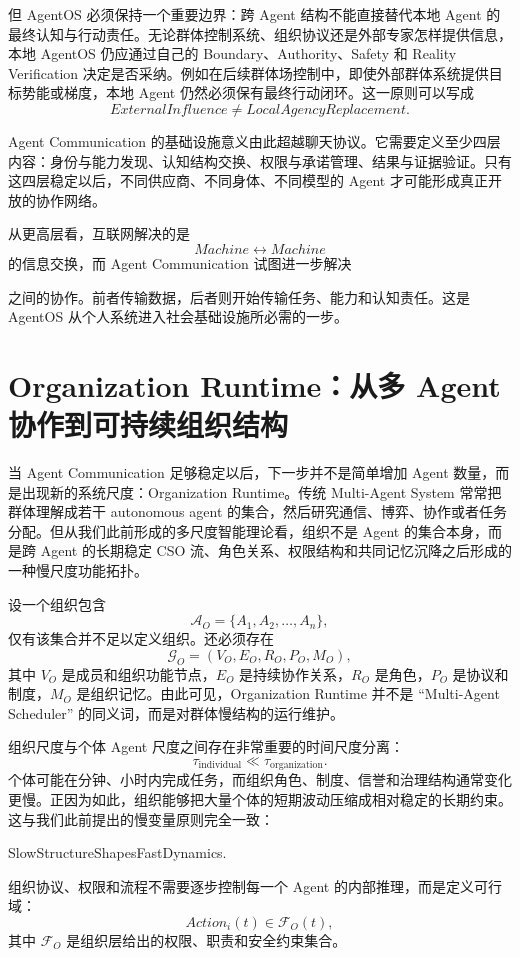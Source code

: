 但 AgentOS 必须保持一个重要边界：跨 Agent 结构不能直接替代本地 Agent 的最终认知与行动责任。无论群体控制系统、组织协议还是外部专家怎样提供信息，本地 AgentOS 仍应通过自己的 Boundary、Authority、Safety 和 Reality Verification 决定是否采纳。例如在后续群体场控制中，即使外部群体系统提供目标势能或梯度，本地 Agent 仍然必须保有最终行动闭环。这一原则可以写成
\[
ExternalInfluence
\neq
LocalAgencyReplacement.
\]

Agent Communication 的基础设施意义由此超越聊天协议。它需要定义至少四层内容：身份与能力发现、认知结构交换、权限与承诺管理、结果与证据验证。只有这四层稳定以后，不同供应商、不同身体、不同模型的 Agent 才可能形成真正开放的协作网络。

从更高层看，互联网解决的是
\[
Machine\leftrightarrow Machine
\]
的信息交换，而 Agent Communication 试图进一步解决
\begin{statementbox}
\centering
{}
\end{statementbox}
之间的协作。前者传输数据，后者则开始传输任务、能力和认知责任。这是 AgentOS 从个人系统进入社会基础设施所必需的一步。

\section{Organization Runtime：从多 Agent 协作到可持续组织结构}

当 Agent Communication 足够稳定以后，下一步并不是简单增加 Agent 数量，而是出现新的系统尺度：Organization Runtime。传统 Multi-Agent System 常常把群体理解成若干 autonomous agent 的集合，然后研究通信、博弈、协作或者任务分配。但从我们此前形成的多尺度智能理论看，组织不是 Agent 的集合本身，而是跨 Agent 的长期稳定 CSO 流、角色关系、权限结构和共同记忆沉降之后形成的一种慢尺度功能拓扑。

设一个组织包含
\[
\mathcal A_O=\{A_1,A_2,\ldots,A_n\},
\]
仅有该集合并不足以定义组织。还必须存在
\[
\mathcal G_O
=
(V_O,E_O,R_O,P_O,M_O),
\]
其中 $V_O$ 是成员和组织功能节点，$E_O$ 是持续协作关系，$R_O$ 是角色，$P_O$ 是协议和制度，$M_O$ 是组织记忆。由此可见，Organization Runtime 并不是 ``Multi-Agent Scheduler'' 的同义词，而是对群体慢结构的运行维护。

组织尺度与个体 Agent 尺度之间存在非常重要的时间尺度分离：
\[
\tau_{\mathrm{individual}}
\ll
\tau_{\mathrm{organization}}.
\]
个体可能在分钟、小时内完成任务，而组织角色、制度、信誉和治理结构通常变化更慢。正因为如此，组织能够把大量个体的短期波动压缩成相对稳定的长期约束。这与我们此前提出的慢变量原则完全一致：
\begin{statementbox}
SlowStructureShapesFastDynamics.
\end{statementbox}
组织协议、权限和流程不需要逐步控制每一个 Agent 的内部推理，而是定义可行域：
\[
Action_i(t)\in\mathcal F_O(t),
\]
其中 $\mathcal F_O$ 是组织层给出的权限、职责和安全约束集合。

